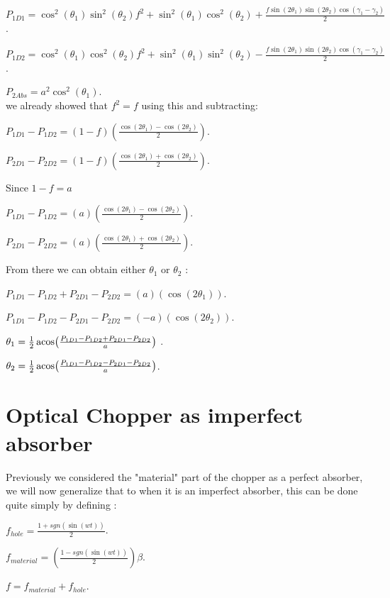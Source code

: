 \documentclass[11pt]{article}
\begin{document}
\vspace{15cm}

$P_{1D1}=\cos^2(\theta_{1})\sin^2(\theta_{2})f^2+ \sin^2(\theta_{1})\cos^2(\theta_{2})+\frac{f \sin(2\theta_{1})\sin(2\theta_{2})\cos(\gamma_{1}-\gamma_{2})}{2}$.

$P_{1D2}=\cos^2(\theta_{1})\cos^2(\theta_{2})f^2+ \sin^2(\theta_{1})\sin^2(\theta_{2})-\frac{f \sin(2\theta_{1})\sin(2\theta_{2})\cos(\gamma_{1}-\gamma_{2})}{2}$.

$P_{2Abs}=a^2 \cos^2(\theta_{1})$.\\


we already showed that $f^2=f$ using this and subtracting:

$P_{1D1}-P_{1D2}=(1-f)\left(\frac{\cos(2 \theta_{1})-\cos(2 \theta_{2})}{2}\right)$.

$P_{2D1}-P_{2D2}=(1-f)\left(\frac{\cos(2 \theta_{1})+\cos(2 \theta_{2})}{2}\right)$.

Since $1-f=a$

$P_{1D1}-P_{1D2}=(a)\left(\frac{\cos(2 \theta_{1})-\cos(2 \theta_{2})}{2}\right)$.

$P_{2D1}-P_{2D2}=(a)\left(\frac{\cos(2 \theta_{1})+\cos(2 \theta_{2})}{2}\right)$.

 From there we can obtain either $\theta_{1}$  or $\theta_{2}$ :

$P_{1D1}-P_{1D2}+P_{2D1}-P_{2D2}=(a)(\cos(2 \theta_{1}))$.

$P_{1D1}-P_{1D2}-P_{2D1}-P_{2D2}=(-a)(\cos(2 \theta_{2}))$.


$ \theta_{1}=\frac{1}{2}\acos(\frac{P_{1D1}-P_{1D2}+P_{2D1}-P_{2D2}}{a})$ .

$\theta_{2}=\frac{1}{2}\acos(\frac{P_{1D1}-P_{1D2}-P_{2D1}-P_{2D2}}{a})$.

\section{Optical Chopper as imperfect absorber}

Previously we considered the "material" part of the chopper as a perfect absorber, we will now generalize that to when it is an imperfect absorber, this can be done quite simply by defining :
 
 \vspace{1 cm}
 
 $f_{hole}=\frac{1+sgn(\sin(wt))}{2}$.

$f_{material}=\left(\frac{1-sgn(\sin(wt))}{2} \right)\beta$.

$f=f_{material}+f_{hole}$.
\end{document}
